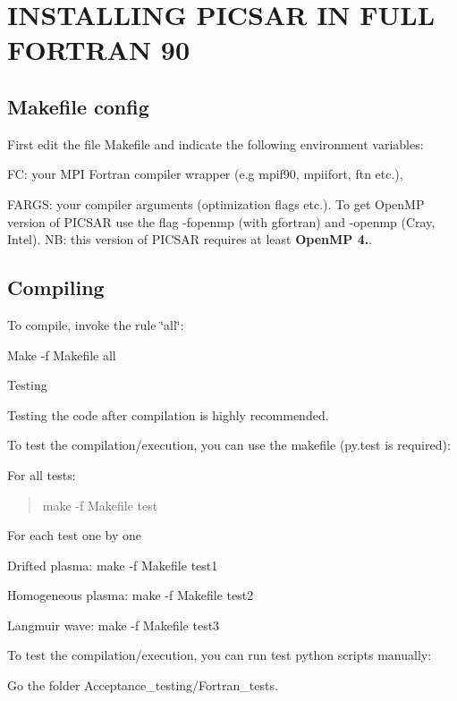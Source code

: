 \section*{I\+N\+S\+T\+A\+L\+L\+I\+NG P\+I\+C\+S\+AR IN F\+U\+LL F\+O\+R\+T\+R\+AN 90 }

\subsection*{Makefile config }

First edit the file Makefile and indicate the following environment variables\+:

FC\+: your M\+PI Fortran compiler wrapper (e.\+g mpif90, mpiifort, ftn etc.),

F\+A\+R\+GS\+: your compiler arguments (optimization flags etc.). To get Open\+MP version of P\+I\+C\+S\+AR use the flag -\/fopenmp (with gfortran) and -\/openmp (Cray, Intel). NB\+: this version of P\+I\+C\+S\+AR requires at least {\bfseries Open\+MP 4.}.

\subsection*{Compiling }

To compile, invoke the rule \char`\"{}all\char`\"{}\+:

Make -\/f Makefile all

Testing 



Testing the code after compilation is highly recommended.

To test the compilation/execution, you can use the makefile (py.\+test is required)\+:

For all tests\+: \begin{quote}
make -\/f Makefile test \end{quote}


For each test one by one
\begin{DoxyItemize}
\item Drifted plasma\+: make -\/f Makefile test1
\item Homogeneous plasma\+: make -\/f Makefile test2
\item Langmuir wave\+: make -\/f Makefile test3
\end{DoxyItemize}

To test the compilation/execution, you can run test python scripts manually\+:

Go the folder Acceptance\+\_\+testing/\+Fortran\+\_\+tests.

